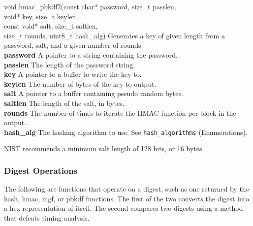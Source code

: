 \documentclass[titlepage]{article}
\begin{document}
			\begin{functionspec}[]{void hmac\_pbkdf2(const char* password, size\_t passlen,\\\tabto{35mm}void* key,  size\_t keylen\\\tabto{35mm}const void* salt, size\_t saltlen,\\\tabto{35mm}size\_t rounds, uint8\_t hash\_alg)}
				Generates a key of given length from a password, salt, and a given number of rounds.\\
				\textbf{password} A pointer to a string containing the password.\\
				\textbf{passlen} The length of the password string.\\
				\textbf{key} A pointer to a buffer to write the key to.\\
				\textbf{keylen} The number of bytes of the key to output.\\
				\textbf{salt} A pointer to a buffer containing pseudo random bytes.\\
				\textbf{saltlen} The length of the salt, in bytes.\\
				\textbf{rounds} The number of times to iterate the HMAC function per block in the output.\\
				\textbf{hash\_alg} The hashing algorithm to use. See \texttt{hash\_algorithms} (Enumerations).
				\begin{notespec}
					NIST recommends a minimum salt length of 128 bits, or 16 bytes.
				\end{notespec}
			\end{functionspec}
		
		\subsubsection{Digest Operations}
			The following are functions that operate on a digest, such as one returned by the hash, hmac, mgf, or pbkdf functions. The first of the two converts the digest into a hex representation of itself. The second compares two digests using a method that defeats timing analysis.
		
\end{document}
